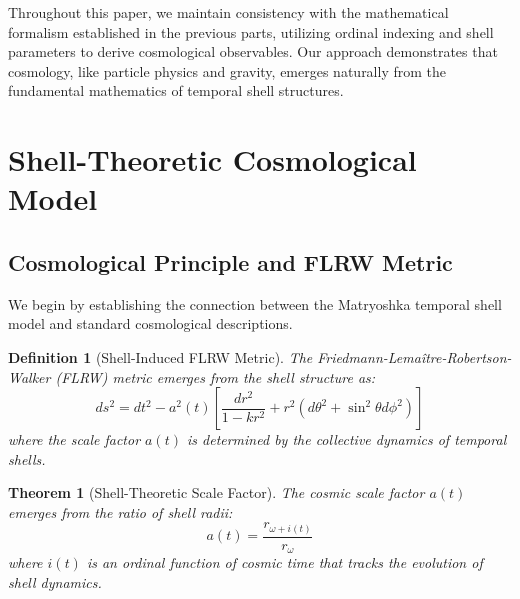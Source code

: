 \documentclass[12pt,a4paper]{article}
\newtheorem{theorem}{Theorem}[section]
\newtheorem{definition}{Definition}[section]
\begin{document}
Throughout this paper, we maintain consistency with the mathematical formalism established in the previous parts, utilizing ordinal indexing and shell parameters to derive cosmological observables. Our approach demonstrates that cosmology, like particle physics and gravity, emerges naturally from the fundamental mathematics of temporal shell structures.

\section{Shell-Theoretic Cosmological Model}
\label{sec:cosmological-model}

\subsection{Cosmological Principle and FLRW Metric}
\label{subsec:cosmological-principle}

We begin by establishing the connection between the Matryoshka temporal shell model and standard cosmological descriptions.

\begin{definition}[Shell-Induced FLRW Metric]
\label{def:shell-flrw}
The Friedmann-Lemaître-Robertson-Walker (FLRW) metric emerges from the shell structure as:
\begin{equation}
ds^2 = dt^2 - a^2(t)\left[\frac{dr^2}{1-kr^2} + r^2(d\theta^2 + \sin^2\theta d\phi^2)\right]
\end{equation}
where the scale factor $a(t)$ is determined by the collective dynamics of temporal shells.
\end{definition}

\begin{theorem}[Shell-Theoretic Scale Factor]
\label{thm:scale-factor}
The cosmic scale factor $a(t)$ emerges from the ratio of shell radii:
\begin{equation}
a(t) = \frac{r_{\omega+i(t)}}{r_{\omega}}
\end{equation}
where $i(t)$ is an ordinal function of cosmic time that tracks the evolution of shell dynamics.
\end{theorem}
\end{document}

